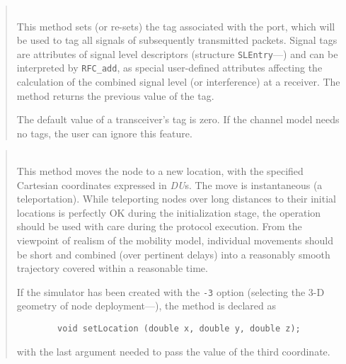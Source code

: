 \begin{quote}
\noindent{} \hspace{0in}\vspace{0.05in}\\
\noindent
This method sets (or re-sets) the tag associated with the port, which will be
used to tag all signals of subsequently transmitted packets.
Signal tags are attributes of signal level descriptors (structure
{\tt SLEntry}---)
and can be interpreted by {\tt RFC\_add}, as special user-defined
attributes affecting the calculation of the combined signal level
(or interference) at a receiver.
The method returns the previous value of the tag.

\noindent
The default value of a transceiver's tag is zero.
If the channel model
needs no tags, the user can ignore this feature.
\end{quote}

\begin{quote}
\noindent{} \hspace{0in}\vspace{0.05in}\\
\noindent
This method moves the node to a new location, with the specified
Cartesian coordinates expressed in {\em DU\/}s.
The move is instantaneous (a teleportation).
While teleporting nodes over long distances to their initial locations
is perfectly OK during the initialization stage, the operation should be used
with care during the protocol execution.
From the viewpoint of realism of the mobility model, individual movements
should be short and combined (over pertinent delays) into a reasonably smooth
trajectory covered within a reasonable time.

\noindent
If the simulator has been created with the {\tt -3} option (selecting the
3-D geometry of node deployment---), the method is
declared as
\begin{verbatim}
        void setLocation (double x, double y, double z);
\end{verbatim}
\noindent
with the last argument needed to pass the value of the third coordinate.
\end{quote}

